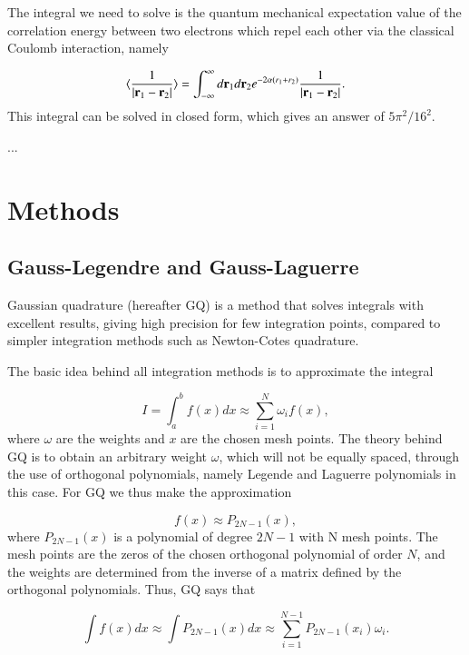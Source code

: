 \documentclass{article}
\begin{document}
\begin{multicols}{2}
The integral we need to solve is the quantum mechanical expectation value of the correlation energy between two electrons which repel each other via the classical Coulomb interaction, namely

\begin{equation}\label{eq:correlationenergy}
	\langle \frac{1}{|{\bf r}_1-{\bf r}_2|} \rangle = \int_{-\infty}^{\infty} d{\bf r}_1d{\bf r}_2  e^{-2\alpha (r_1+r_2)}\frac{1}{|{\bf r}_1-{\bf r}_2|}.
\end{equation}
This integral can be solved in closed form, which gives an answer of $5\pi^2/16^2$.


...


\section{Methods}

\subsection{Gauss-Legendre and Gauss-Laguerre}
Gaussian quadrature (hereafter GQ) is a method that solves integrals with excellent results, giving high precision for few integration points, compared to simpler integration methods such as Newton-Cotes quadrature. 

The basic idea behind all integration methods is to approximate the integral

\begin{equation}
	I = \int_a^b f(x) dx \approx \sum_{i = 1}^N \omega_i f(x),
\end{equation}
where $\omega$ are the weights and $x$ are the chosen mesh points. The theory behind GQ is to obtain an arbitrary weight $\omega$, which will not be equally spaced, through the use of orthogonal polynomials, namely Legende and Laguerre polynomials in this case. For GQ we thus make the approximation

\begin{equation}
	f(x) \approx P_{2N-1} (x),
\end{equation}
where $P_{2N-1} (x)$ is a polynomial of degree $2N-1$ with N mesh points. The mesh points are the zeros of the chosen orthogonal polynomial of order $N$, and the weights are determined from the inverse of a matrix defined by the orthogonal polynomials. Thus, GQ says that

\begin{equation}
	\int f(x) dx \approx \int P_{2N-1}(x) dx \approx \sum_{i = 1}^{N-1} P_{2N-1}(x_i) \omega_i.
\end{equation}



\end{multicols}
\end{document}
